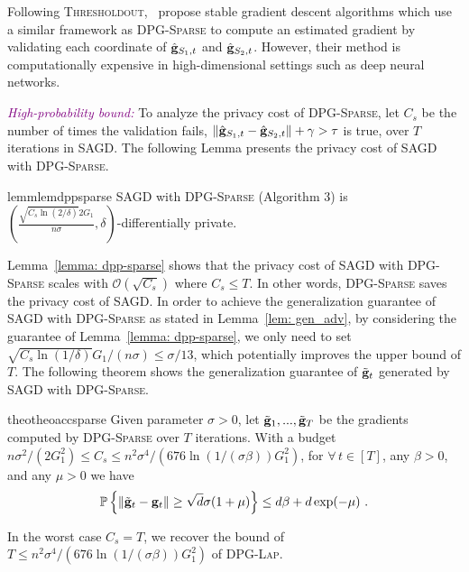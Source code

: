 \documentclass[11pt]{article}
\begin{document}
Following \textsc{Thresholdout},~\citet{zhch2018} propose stable gradient descent algorithms which use a similar framework as \textsc{DPG-Sparse} to compute an estimated gradient by validating each coordinate of $\hat {\mathbf{g}}_{S_1,t}$ and $\hat {\mathbf{g}}_{S_2,t}$. 
However, their method is computationally expensive in high-dimensional settings such as deep neural networks. 

\textcolor{purple}{\textit{High-probability bound:}}
To analyze the privacy cost of \textsc{DPG-Sparse}, let $C_{s}$ be the number of times the validation fails, \ie $\| \hat {\mathbf{g}}_{S_1,t} - \hat {\mathbf{g}}_{S_2,t}\| + \gamma >  \tau$ is true, over $T$ iterations in \textsc{SAGD}. The following Lemma presents the privacy cost of \textsc{SAGD} with \textsc{DPG-Sparse}.
\begin{restatable}{lemm}{lemdppsparse}
\label{lemma: dpp-sparse}
\textsc{SAGD} with \textsc{DPG-Sparse}  (Algorithm 3) is  
$(\frac{\sqrt{C_{s} \ln(2/\delta)} 2G_1}{n\sigma}, \delta)$-differentially private. 
\end{restatable}
Lemma~\ref{lemma: dpp-sparse} shows that the privacy cost of  \textsc{SAGD} with \textsc{DPG-Sparse} scales with $\mathcal{O}(\sqrt{C_{s}})$ where $C_{s} \leq T$. In other words, \textsc{DPG-Sparse} saves the privacy cost of \textsc{SAGD}. In order to achieve the generalization guarantee of \textsc{SAGD} with \textsc{DPG-Sparse} as stated in Lemma~\ref{lem: gen_adv},  by considering the guarantee of Lemma~\ref{lemma: dpp-sparse},  we only need to set $\sqrt{C_{s} \ln(1/\delta)} G_1/(n\sigma) \leq \sigma/13$, which potentially improves the upper bound of $T$. 
The following theorem shows the generalization guarantee of $\tilde {\mathbf{g}}_t$ generated by \textsc{SAGD} with \textsc{DPG-Sparse}.
\begin{restatable}{theo}{theoaccsparse}
\label{thm: acc_sparse}
Given parameter $\sigma > 0$, let $\tilde {\mathbf{g}}_1,...,  \tilde {\mathbf{g}}_T$ be the gradients computed by \textsc{DPG-Sparse} over $T$ iterations. With a budget $ n\sigma^2/(2G_1^2) \leq C_{s} \leq n^2 \sigma^4/(676 \ln(1/(\sigma \beta))G_1^2)$, for $\forall\, t \in [T]$, any $\beta > 0$, and any $\mu > 0$ we have 
        \begin{equation*}
    \mathbb{P}\left\{\|\tilde {\mathbf{g}}_t - \mathbf{g}_t\| \geq \sqrt{d}\sigma(1+\mu)\right\} \leq d\beta + d\exp(-\mu)~.
    \end{equation*}
\end{restatable}
In the worst case $C_{s} = T$, we recover the bound of $T \leq n^2 \sigma^4/(676 \ln(1/(\sigma \beta))G_1^2)$ of \textsc{DPG-Lap}.
\end{document}
